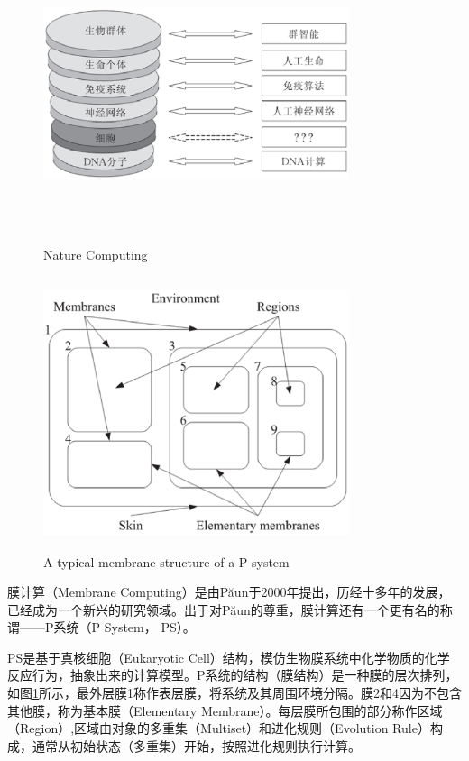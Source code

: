 \begin{figure}[htbp]
\begin{minipage}[t]{0.49\linewidth}
\centering
\includegraphics[width=0.8\textwidth, height=8cm]{figures/naturecompute.eps}
\caption{Nature Computing\cite{zhang2010nature}}
\end{minipage}
\begin{minipage}[t]{0.49\linewidth}
\centering
\includegraphics[width=0.8\textwidth, height=8cm]{figures/membrane.eps}
\caption{A typical membrane structure of a P system\cite{buiu2012development}}
\label{fig:membrane}
\end{minipage}
\end{figure}

膜计算（Membrane Computing）是由P{\u{a}}un于2000年提出\cite{paun2000computing}，历经十多年的发展，已经成为一个新兴的研究领域。出于对P{\u{a}}un的尊重，膜计算还有一个更有名的称谓——P系统（P System， PS）。

PS是基于真核细胞（Eukaryotic Cell）结构，模仿生物膜系统中化学物质的化学反应行为，抽象出来的计算模型。P系统的结构（膜结构）是一种膜的层次排列，如图\ref{fig:membrane}所示，最外层膜1称作表层膜，将系统及其周围环境分隔。膜2和4因为不包含其他膜，称为基本膜（Elementary Membrane）。每层膜所包围的部分称作区域（Region）,区域由对象的多重集（Multiset）和进化规则（Evolution Rule）构成，通常从初始状态（多重集）开始，按照进化规则执行计算。

